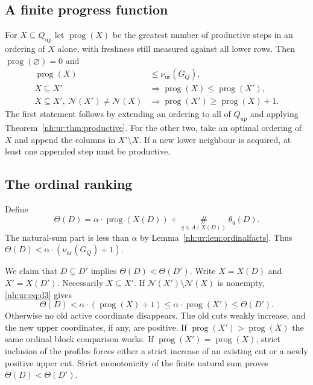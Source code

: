 \documentclass[11pt,a4paper]{article}
\theoremstyle{definition}
\theoremstyle{remark}
\newcommand{\bigns}{\mathop{\#}\limits}
\newcommand{\Qup}{Q_{\mathrm{up}}}
\newcommand{\Nb}{\mathcal N}
\newcommand{\nuur}{\nu_{\mathrm{ur}}}
\begin{document}
\subsection{A finite progress function}
For $X\subseteq\Qup$ let $\operatorname{prog}(X)$ be the greatest number of
productive steps in an ordering of $X$ alone, with freshness still measured
against all lower rows. Then $\operatorname{prog}(\varnothing)=0$ and
\begin{align}
 \operatorname{prog}(X)&\le\nuur(G_Q),\label{nh:ur:eq:d1}\\
 X\subseteq X'&\Longrightarrow \operatorname{prog}(X)\le\operatorname{prog}(X'),\label{nh:ur:eq:d2}\\
 X\subseteq X',\ \Nb(X')\ne\Nb(X)&\Longrightarrow
 \operatorname{prog}(X')\ge\operatorname{prog}(X)+1.
 \label{nh:ur:eq:d3}
\end{align}
The first statement follows by extending an ordering to all of $\Qup$ and
applying Theorem~\ref{nh:ur:thm:productive}. For the other two, take an
optimal ordering of $X$ and append the columns in $X'\setminus X$. If a new
lower neighbour is acquired, at least one appended step must be productive.

\subsection{The ordinal ranking}
Define
\begin{equation}\label{nh:ur:eq:rankmap}
 \Theta(D)=\alpha\cdot\operatorname{prog}(X(D))+
       \bigns_{q\in A(X(D))}\theta_q(D).
\end{equation}
The natural-sum part is less than $\alpha$ by
Lemma~\ref{nh:ur:lem:ordinalfacts}. Thus
$\Theta(D)<\alpha\cdot(\nuur(G_Q)+1)$.

We claim that $D\subsetneq D'$ implies $\Theta(D)<\Theta(D')$. Write
$X=X(D)$ and $X'=X(D')$. Necessarily $X\subseteq X'$. If
$\Nb(X')\setminus\Nb(X)$ is nonempty, \eqref{nh:ur:eq:d3} gives
\[
 \Theta(D)<\alpha\cdot(\operatorname{prog}(X)+1)\le
 \alpha\cdot\operatorname{prog}(X')\le\Theta(D').
\]
Otherwise no old active coordinate disappears. The old cuts weakly increase,
and the new upper coordinates, if any, are positive. If
$\operatorname{prog}(X')>\operatorname{prog}(X)$ the same ordinal block
comparison works. If $\operatorname{prog}(X')=\operatorname{prog}(X)$, strict
inclusion of the profiles forces either a strict increase of an existing cut
or a newly positive upper cut. Strict monotonicity of the finite natural sum
proves $\Theta(D)<\Theta(D')$.
\end{document}
